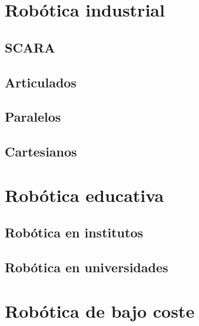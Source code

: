 \section{Robótica industrial}
\label{sec:rob_industrial}


\subsection{SCARA}
\subsection{Articulados}
\subsection{Paralelos}
\subsection{Cartesianos}

\section{Robótica educativa}
\label{sec:rob_educativa}
\subsection{Robótica en institutos}
\subsection{Robótica en universidades}

\section{Robótica de bajo coste}
\label{sec:rob_bajo:coste}

